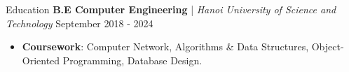 \begin{rSection}{Education}
    \textbf{B.E Computer Engineering} | \textit{ Hanoi University of Science and Technology } \hfill {September 2018 - 2024}
    \begin{itemize}
        \itemsep 0pt {} \vspace{0.5em}
        \item \textbf{Coursework}: Computer Network, Algorithms \& Data Structures, Object-Oriented Programming, Database Design.
    \end{itemize}
\end{rSection}